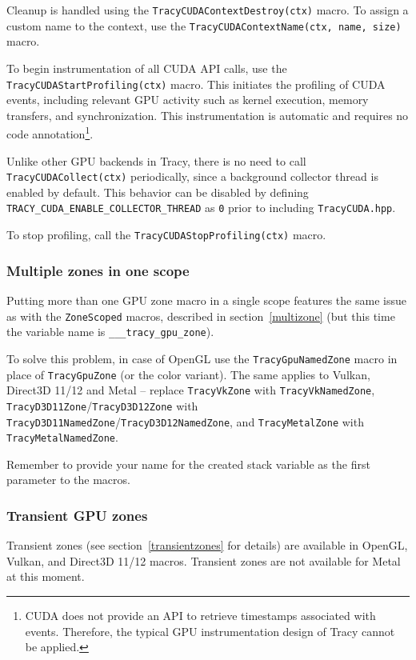 \documentclass[hidelinks,titlepage,a4paper,twoside]{article}
\begin{document}
Cleanup is handled using the \texttt{TracyCUDAContextDestroy(ctx)} macro. To assign a custom name to the context, use the \texttt{TracyCUDAContextName(ctx, name, size)} macro.

To begin instrumentation of all CUDA API calls, use the \texttt{TracyCUDAStartProfiling(ctx)} macro. This initiates the profiling of CUDA events, including relevant GPU activity such as kernel execution, memory transfers, and synchronization. This instrumentation is automatic and requires no code annotation\footnote{CUDA does not provide an API to retrieve timestamps associated with events. Therefore, the typical GPU instrumentation design of Tracy cannot be applied.}.

Unlike other GPU backends in Tracy, there is no need to call \texttt{TracyCUDACollect(ctx)} periodically, since a background collector thread is enabled by default. This behavior can be disabled by defining \texttt{TRACY\_CUDA\_ENABLE\_COLLECTOR\_THREAD} as \texttt{0} prior to including \texttt{TracyCUDA.hpp}.

To stop profiling, call the \texttt{TracyCUDAStopProfiling(ctx)} macro.

\subsubsection{Multiple zones in one scope}

Putting more than one GPU zone macro in a single scope features the same issue as with the \texttt{ZoneScoped} macros, described in section~\ref{multizone} (but this time the variable name is \texttt{\_\_\_tracy\_gpu\_zone}).

To solve this problem, in case of OpenGL use the \texttt{TracyGpuNamedZone} macro in place of \texttt{TracyGpuZone} (or the color variant). The same applies to Vulkan, Direct3D 11/12 and Metal -- replace \texttt{TracyVkZone} with \texttt{TracyVkNamedZone}, \texttt{TracyD3D11Zone}/\texttt{TracyD3D12Zone} with \texttt{TracyD3D11NamedZone}/\texttt{TracyD3D12NamedZone}, and \texttt{TracyMetalZone} with \texttt{TracyMetalNamedZone}.

Remember to provide your name for the created stack variable as the first parameter to the macros.

\subsubsection{Transient GPU zones}

Transient zones (see section~\ref{transientzones} for details) are available in OpenGL, Vulkan, and Direct3D 11/12 macros. Transient zones are not available for Metal at this moment.
\end{document}
